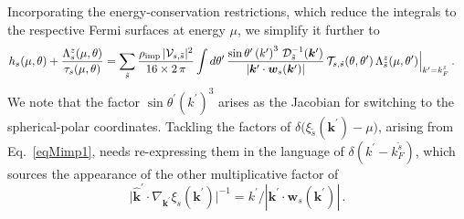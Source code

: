 \documentclass[aps,prb,onecolumn,nofootinbib,citeautoscript,10pt, showkeys]{revtex4-2}
\begin{document}
Incorporating the energy-conservation restrictions, which reduce the integrals to the respective Fermi surfaces at energy $ \mu $, we simplify it further to
\begin{align}
\label{eqlambdamu}
& h_s(\mu, \theta) + \frac{ {\Lambda}^z_s  (\mu, \theta)} 
{\tau_s(\mu, \theta)} =
\sum_{\tilde s}  
\frac{ \rho_{\rm imp} 
\, |{\mathcal V} _{ s, \tilde s} |^2 }
{ 16 \times 2\, \pi }
\int d\theta^\prime \, \frac{\sin \theta^\prime \left (k^\prime \right )^3 
\, {\mathcal D}^{-1}_{\tilde s} ({\boldsymbol k}^\prime)}
{  |\boldsymbol k^\prime \cdot {\boldsymbol{w}}_s (\boldsymbol k^\prime)  | }
\, {\mathcal T }_{ s, \tilde s} (\theta, \theta^\prime)
\, {\Lambda}^z_{\tilde s} (\mu, \theta^\prime ) 
\Big \vert_{ k^\prime = k_F^{\tilde s} } \,.
\end{align}
We note that the factor $ \sin \theta^\prime \left (k^\prime \right )^3  $ arises as the Jacobian for switching to the spherical-polar coordinates. Tackling the factors of $ \delta \Big( \xi_{\tilde s } (\boldsymbol k^\prime) -\mu \Big) $, arising from Eq.~\eqref{eqMimp1}, needs re-expressing them in the language of $\delta (k^\prime - k_F^{\tilde s})$, which sources the appearance of the other multiplicative factor of 
$$  \big |\boldsymbol {\hat k^\prime} \cdot 
 \nabla_{\boldsymbol k^\prime} \xi_s({\boldsymbol k^\prime}) \big |^{-1}  
 = k^\prime / |\boldsymbol k^\prime \cdot {\boldsymbol{w}}_s (\boldsymbol k^\prime)  |\,.$$
\end{document}
